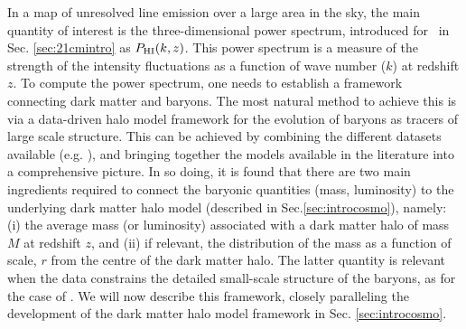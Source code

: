 In a map of unresolved line emission over a large area in the sky, the main quantity of interest is the three-dimensional power spectrum, introduced for \HI\ in Sec. \ref{sec:21cmintro} as $P_{\rm HI} (k,z)$. This power spectrum is a measure of the strength of the intensity fluctuations as a function of wave number ($k$) at redshift $z$. To compute the power spectrum, one needs to establish a framework connecting dark matter and baryons. The most natural method to achieve this is via a data-driven halo model framework \cite{hpar2017}  for the evolution of baryons as tracers of large scale structure. This can be achieved by combining the different datasets available (e.g. \cite{hptrcar2015}), and bringing together the models available in the literature \cite{hptrcar2016} into a comprehensive picture. In so doing, it is found that there are two main ingredients required to connect the baryonic quantities (mass, luminosity) to the underlying dark matter halo model (described in Sec.\ref{sec:introcosmo}), namely:
(i) the average mass (or luminosity) associated with a dark matter halo of mass $M$ at redshift $z$, and (ii) if relevant, the distribution of the mass as a function of scale, $r$ from the centre of the dark matter halo. The latter quantity is relevant when the data constrains the detailed small-scale structure of the baryons, as for the case of \HI. We will now  describe this framework, closely paralleling the development of the dark matter halo model framework in Sec. \ref{sec:introcosmo}.

